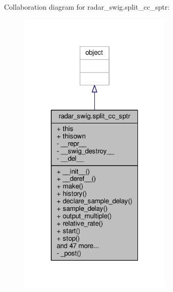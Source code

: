 Collaboration diagram for radar\+\_\+swig.\+split\+\_\+cc\+\_\+sptr\+:
\nopagebreak
\begin{figure}[H]
\begin{center}
\leavevmode
\includegraphics[width=208pt]{d4/db9/classradar__swig_1_1split__cc__sptr__coll__graph}
\end{center}
\end{figure}
